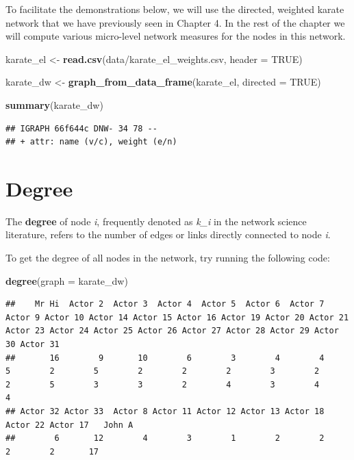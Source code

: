 \documentclass[
]{book}
\newenvironment{Shaded}{\begin{snugshade}}{\end{snugshade}}
\newcommand{\AttributeTok}[1]{\textcolor[rgb]{0.13,0.29,0.53}{#1}}
\newcommand{\ConstantTok}[1]{\textcolor[rgb]{0.56,0.35,0.01}{#1}}
\newcommand{\FunctionTok}[1]{\textcolor[rgb]{0.13,0.29,0.53}{\textbf{#1}}}
\newcommand{\NormalTok}[1]{#1}
\newcommand{\OtherTok}[1]{\textcolor[rgb]{0.56,0.35,0.01}{#1}}
\newcommand{\StringTok}[1]{\textcolor[rgb]{0.31,0.60,0.02}{#1}}
\begin{document}
To facilitate the demonstrations below, we will use the directed, weighted karate network that we have previously seen in Chapter 4. In the rest of the chapter we will compute various micro-level network measures for the nodes in this network.

\begin{Shaded}
\begin{Highlighting}[]
\NormalTok{karate\_el }\OtherTok{\textless{}{-}} \FunctionTok{read.csv}\NormalTok{(}\StringTok{\textquotesingle{}data/karate\_el\_weights.csv\textquotesingle{}}\NormalTok{, }\AttributeTok{header =} \ConstantTok{TRUE}\NormalTok{)}

\NormalTok{karate\_dw }\OtherTok{\textless{}{-}} \FunctionTok{graph\_from\_data\_frame}\NormalTok{(karate\_el, }\AttributeTok{directed =} \ConstantTok{TRUE}\NormalTok{)}

\FunctionTok{summary}\NormalTok{(karate\_dw)}
\end{Highlighting}
\end{Shaded}

\begin{verbatim}
## IGRAPH 66f644c DNW- 34 78 -- 
## + attr: name (v/c), weight (e/n)
\end{verbatim}

\section{Degree}\label{degree}

The \textbf{degree} of node \emph{i}, frequently denoted as \emph{k\_i} in the network science literature, refers to the number of edges or links directly connected to node \emph{i}.

To get the degree of all nodes in the network, try running the following code:

\begin{Shaded}
\begin{Highlighting}[]
\FunctionTok{degree}\NormalTok{(}\AttributeTok{graph =}\NormalTok{ karate\_dw)}
\end{Highlighting}
\end{Shaded}

\begin{verbatim}
##    Mr Hi  Actor 2  Actor 3  Actor 4  Actor 5  Actor 6  Actor 7  Actor 9 Actor 10 Actor 14 Actor 15 Actor 16 Actor 19 Actor 20 Actor 21 Actor 23 Actor 24 Actor 25 Actor 26 Actor 27 Actor 28 Actor 29 Actor 30 Actor 31 
##       16        9       10        6        3        4        4        5        2        5        2        2        2        3        2        2        5        3        3        2        4        3        4        4 
## Actor 32 Actor 33  Actor 8 Actor 11 Actor 12 Actor 13 Actor 18 Actor 22 Actor 17   John A 
##        6       12        4        3        1        2        2        2        2       17
\end{verbatim}
\end{document}

